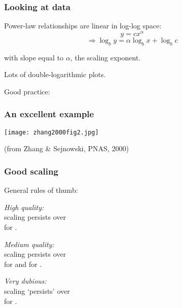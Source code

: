 \begin{frame}
  \frametitle{Looking at data}

Power-law relationships
are linear in log-log space:
$$y = c x^\alpha $$
$$ \Rightarrow \log_{b} y = \alpha \log_{b} x + \log_{b} c$$

with slope equal to $\alpha$, the scaling exponent.

 Lots of double-logarithmic plots.

 Good practice: 

\end{frame}

\begin{frame}
  \frametitle{An excellent example}

\texttt{[image: zhang2000fig2.jpg]}  

\hfill{\tiny(from Zhang \& Sejnowski, PNAS, 2000)}

\end{frame}

\begin{frame}
  \frametitle{Good scaling}

General rules of thumb:

\textit{High quality:}\\ scaling persists 
over \\
for .

\inv

\textit{Medium quality:}\\ scaling persists
over \\
for  and 
 for .

\textit{Very dubious:}\\ scaling `persists'
over \\
for .

\end{frame}

